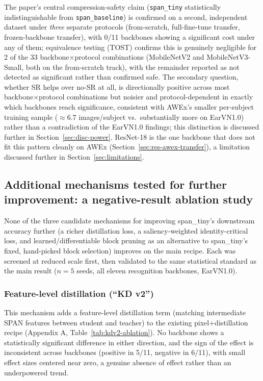 \documentclass[pdflatex,sn-vancouver-num]{sn-jnl}
\begin{document}
The paper's central compression-safety claim (\texttt{span\_tiny} statistically indistinguishable from \texttt{span\_baseline}) is confirmed on a second, independent dataset under \emph{three} separate protocols (from-scratch, full-fine-tune transfer, frozen-backbone transfer), with 0/11 backbones showing a significant cost under any of them; equivalence testing (TOST) confirms this is genuinely negligible for 2 of the 33 backbone$\times$protocol combinations (MobileNetV2 and MobileNetV3-Small, both on the from-scratch track), with the remainder reported as not detected as significant rather than confirmed safe. The secondary question, whether SR helps over no-SR at all, is directionally positive across most backbone$\times$protocol combinations but noisier and protocol-dependent in exactly which backbones reach significance, consistent with AWEx's smaller per-subject training sample ($\approx$6.7 images/subject vs.\ substantially more on EarVN1.0) rather than a contradiction of the EarVN1.0 findings; this distinction is discussed further in Section~\ref{sec:disc-power}. ResNet-18 is the one backbone that does not fit this pattern cleanly on AWEx (Section~\ref{sec:res-awex-transfer}), a limitation discussed further in Section~\ref{sec:limitations}.

\subsection{Additional mechanisms tested for further improvement: a negative-result ablation study}
\label{sec:novelty-ablations}

None of the three candidate mechanisms for improving span\_tiny's downstream accuracy further (a richer distillation loss, a saliency-weighted identity-critical loss, and learned/differentiable block pruning as an alternative to span\_tiny's fixed, hand-picked block selection) improves on the main recipe. Each was screened at reduced scale first, then validated to the same statistical standard as the main result ($n=5$ seeds, all eleven recognition backbones, EarVN1.0).

\subsubsection{Feature-level distillation (``KD v2'')}

This mechanism adds a feature-level distillation term (matching intermediate SPAN features between student and teacher) to the existing pixel+distillation recipe (Appendix A, Table~\ref{tab:kdv2-ablation}). No backbone shows a statistically significant difference in either direction, and the sign of the effect is inconsistent across backbones (positive in 5/11, negative in 6/11), with small effect sizes centered near zero, a genuine absence of effect rather than an underpowered trend.
\end{document}
